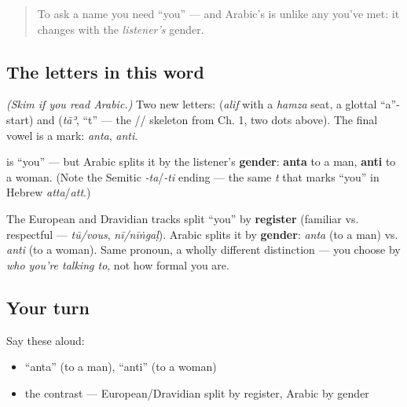 \begin{quote}
To ask a name you need \textquotedblleft{}you\textquotedblright{} — and Arabic's is unlike any you've met: it changes with the \emph{listener's} gender.
\end{quote}

\subsection*{The letters in this word}
\emph{(Skim if you read Arabic.)} Two new letters: \textbf{} (\emph{alif} with a \emph{hamza} seat, a glottal \textquotedblleft{}a\textquotedblright{}-start) and \textbf{} (\emph{tāʾ}, \textquotedblleft{}t\textquotedblright{} — the // skeleton from Ch. 1, two dots above). The final vowel is a mark: \emph{anta}, \emph{anti}.

\begin{cousinweb}
\textbf{} is \textquotedblleft{}you\textquotedblright{} — but Arabic splits it by the listener's \textbf{gender}: \textbf{anta} to a man, \textbf{anti} to a woman. (Note the Semitic \emph{-ta}/\emph{-ti} ending — the same \emph{t} that marks \textquotedblleft{}you\textquotedblright{} in Hebrew \emph{atta}/\emph{att}.)
\end{cousinweb}

\begin{grammarlens}[title={Grammar Lens: a different axis of \textquotedblleft{}you\textquotedblright{}}]
The European and Dravidian tracks split \textquotedblleft{}you\textquotedblright{} by \textbf{register} (familiar vs. respectful — \emph{tū/vous}, \emph{nī/nīṅgaḷ}). Arabic splits it by \textbf{gender}: \emph{anta} (to a man) vs. \emph{anti} (to a woman). Same pronoun, a wholly different distinction — you choose by \emph{who you're talking to}, not how formal you are.
\end{grammarlens}

\subsection*{Your turn}
Say these aloud:

\begin{itemize}
\raggedright
  \item \textquotedblleft{}anta\textquotedblright{} (to a man), \textquotedblleft{}anti\textquotedblright{} (to a woman)
  \item the contrast — European/Dravidian split by register, Arabic by gender
\end{itemize}

